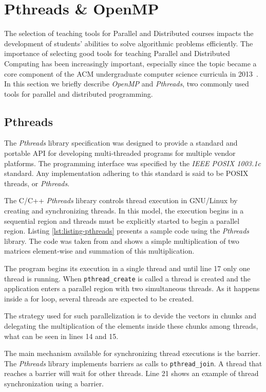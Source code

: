 \section{Pthreads \& OpenMP}
\label{sec:apis}

The selection of teaching tools for Parallel and Distributed courses impacts
the development of students' abilities to solve algorithmic problems
efficiently. The importance of selecting good tools for teaching Parallel and
Distributed Computing has been increasingly important, especially since the
topic became a core component of the ACM undergraduate computer science
curricula in 2013~\cite{acmcurricula}.  In this section we briefly describe
\textit{OpenMP} and \textit{Pthreads}, two commonly used tools for parallel and
distributed programming.

\subsection{Pthreads}

The \textit{Pthreads} library specification was designed to provide a standard
and portable API for developing multi-threaded programs for multiple vendor
platforms.  The programming interface was specified by the \textit{IEEE POSIX
1003.1c} standard. Any implementation adhering to this standard is said to be
POSIX threads, or \textit{Pthreads}.

The C/C++ \textit{Pthreads} library controls thread execution in GNU/Linux by
creating and synchronizing threads. In this model, the execution begins in a
sequential region and threads must be explicitly started to begin
a parallel region.
Listing \ref{lst:listing-pthreads} presents a sample code using the
\textit{Pthreads} library. The code was taken from
\cite{goncalves:OpenMPNotEasy} and shows a simple multiplication of two
matrices element-wise and summation of this multiplication.

The program begins its execution in a single thread and until line 17 only one
thread is running. When \texttt{pthread\_create} is called a thread is created
and the application enters a parallel region with two simultaneous threads. As
it happens inside a for loop, several threads are expected to be created. 

The strategy used for such parallelization is to devide the vectors in chunks
and delegating the multiplication of the elements inside these chunks among
threads, what can be seen in lines 14 and 15.
 
The main mechanism available for synchronizing thread executions is the
barrier. The \textit{Pthreads} library implements barriers as calls to
\texttt{pthread\_join}. A thread that reaches a barrier will wait for other
threads. Line 21 shows an example of thread synchronization using a barrier.

